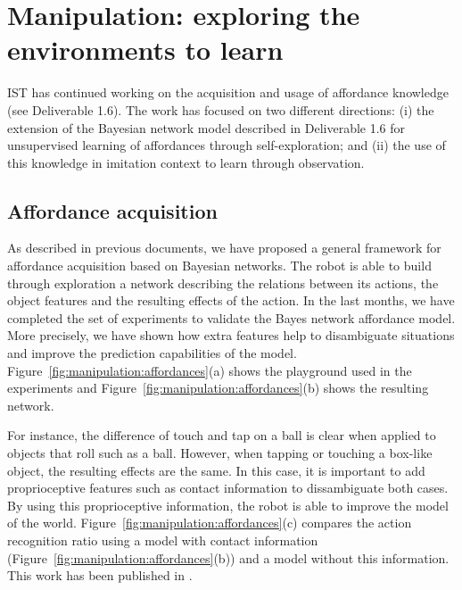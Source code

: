 \section{Manipulation: exploring the environments to learn}

\label{sect:manipulation}

IST has continued working on the acquisition and usage of affordance
knowledge (see Deliverable 1.6). The work has focused on two different
directions: (i) the extension of the Bayesian network model described
in Deliverable 1.6 for unsupervised learning of  affordances through
self-exploration; and (ii) the use of this knowledge in imitation
context to learn through observation.

\subsection{Affordance acquisition}
As described in previous documents, we have proposed a general
framework for affordance acquisition based on Bayesian networks. The
robot is able to build through exploration a network describing the
relations between its actions, the object features and the resulting
effects of the action. In the last months, we have completed the set
of experiments to validate the Bayes network affordance model. More
precisely, we have shown how extra features help to disambiguate
situations and improve the prediction capabilities of the
model. Figure~\ref{fig:manipulation:affordances}(a) shows the playground used in the experiments and
Figure~\ref{fig:manipulation:affordances}(b) shows the resulting network.

For instance, the difference of touch and tap on a ball is clear when
applied to objects that roll such as a ball. However, when tapping or
touching a box-like object, the resulting effects are the same. In
this case, it is important to add proprioceptive features such as
contact information to dissambiguate both cases. By using this
proprioceptive information, the robot is able to improve the model of
the world. Figure~\ref{fig:manipulation:affordances}(c) compares the action recognition ratio using a
model with contact information (Figure~\ref{fig:manipulation:affordances}(b)) and a model without this
information.
This work has been published in \cite{montesano:etal:2007}.

